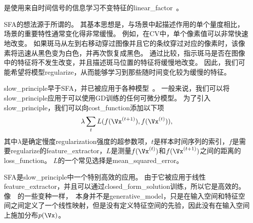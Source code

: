 \section{}
\label{sec:slow_feature_analysis}


是使用来自时间信号的信息学习不变特征的\gls{linear_factor}~\citep{WisSej2002}。


\gls{SFA}的想法源于所谓的。
其基本思想是，与场景中起描述作用的单个量度相比，场景的重要特性通常变化得非常缓慢。
例如，在\gls{CV}中，单个像素值可以非常快速地改变。
如果斑马从左到右移动穿过图像并且它的条纹穿过对应的像素时，该像素将迅速从黑色变为白色，并再次恢复成黑色。
通过比较，指示斑马是否在图像中的特征将不发生改变，并且描述斑马位置的特征将缓慢地改变。
因此，我们可能希望将模型\gls{regularize}，从而能够学习到那些随时间变化较为缓慢的特征。


\gls{slow_principle}早于\gls{SFA}，并已被应用于各种模型~\citep{Hinton89b,Foldiak89,MobahiCollobertWestonICML2009,Bergstra+Bengio-2009}。
一般来说，我们可以将\gls{slow_principle}应用于可以使用\gls{GD}训练的任何可微分模型。 
为了引入\gls{slow_principle}，我们可以向\gls{cost_function}添加以下项
\begin{align}
\label{eqn:137}
\lambda \sum_t L(f(\Vx^{(t+1)}),f(\Vx^{(t)})),
\end{align}
其中$\lambda$是确定慢度\gls{regularization}强度的超参数项，$t$是样本时间序列的索引，$f$是需要\gls{regularize}的\gls{feature_extractor}，$L$是测量$f(\Vx^{(t)})$和$f(\Vx^{(t+1)})$之间的距离的\gls{loss_function}。
$L$的一个常见选择是\gls{mean_squared_error}。


\gls{SFA}是\gls{slow_principle}中一个特别高效的应用。
由于它被应用于线性\gls{feature_extractor}，并且可以通过\gls{closed_form_solution}训练，所以它是高效的。
像~~的一些变种一样，~本身并不是\gls{generative_model}，只是在输入空间和特征空间之间定义了一个线性映射，但是没有定义特征空间的先验，因此没有在输入空间上施加分布$p(\Vx)$。



